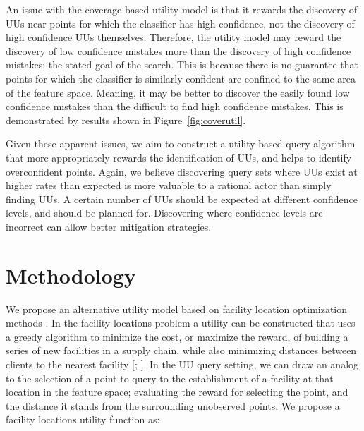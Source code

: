 \documentclass[conference]{IEEEtran}
\begin{document}
An issue with the coverage-based utility model is that it rewards the discovery of UUs near points for which the classifier has high confidence, not the discovery of high confidence UUs themselves.  Therefore, the utility model may reward the discovery of low confidence mistakes more than the discovery of high confidence mistakes; the stated goal of the search. This is because there is no guarantee that points for which the classifier is similarly confident are confined to the same area of the feature space.  Meaning, it may be better to discover the easily found low confidence mistakes than the difficult to find high confidence mistakes. This is demonstrated by results shown in Figure~\ref{fig:coverutil}. 

Given these apparent issues, we aim to construct a utility-based query algorithm that more appropriately rewards the identification of UUs, and helps to identify overconfident points. Again, we believe discovering query sets where UUs exist at higher rates than expected is more valuable to a rational actor than simply finding UUs.  A certain number of UUs should be expected at different confidence levels, and should be planned for.  Discovering where confidence levels are incorrect can allow better mitigation strategies. 

\section{Methodology}

We propose an alternative utility model based on facility location optimization methods  \citep{farahani2009facility}. In the facility locations problem a utility can be constructed that uses a greedy algorithm to minimize the cost, or maximize the reward, of building a series of new facilities in a supply chain, while also minimizing distances between clients to the nearest facility  [\citealt{guha1999greedy}; \citealt{arya2004local}]. In the UU query setting, we can draw an analog to the selection of a point to query to the establishment of a facility at that location in the feature space; evaluating the reward for selecting the point, and the distance it stands from the surrounding unobserved points. We propose a facility locations utility function as: 
\end{document}
